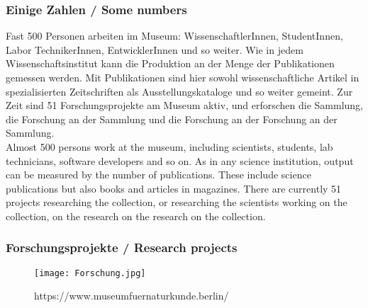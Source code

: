 \documentclass[12pt]{beamer}
\begin{document}
{\scriptsize
\begin{frame}
  \frametitle{ Einige Zahlen / \textcolor{mfn_green}{Some numbers}}
  Fast 500 Personen arbeiten im Museum: WissenschaftlerInnen, StudentInnen, Labor TechnikerInnen, EntwicklerInnen und so weiter. Wie in jedem Wissenschaftsinstitut kann die Produktion an der Menge der Publikationen gemessen werden. Mit Publikationen sind hier sowohl wissenschaftliche Artikel in spezialisierten Zeitschriften als Ausstellungskataloge und so weiter gemeint. Zur Zeit sind 51 Forschungsprojekte am Museum aktiv, und erforschen die Sammlung, die Forschung an der Sammlung und die Forschung an der Forschung an der Sammlung.\\
  \bigskip  
  \textcolor{mfn_green}{Almost 500 persons work at the museum, including scientists, students, lab technicians, software developers and so on. As in any science institution, output can be measured by the number of publications. These include science publications but also books and articles in magazines. There are currently 51 projects researching the collection, or researching the scientists working on the collection, on the research on the research on the collection.}
\end{frame}
}
\begin{frame}
  \frametitle{Forschungsprojekte / \textcolor{mfn_green}{Research projects}}
  \begin{figure}
  \texttt{[image: Forschung.jpg]}
  \caption{https://www.museumfuernaturkunde.berlin/}
  \end{figure}
\end{frame}
\end{document}
